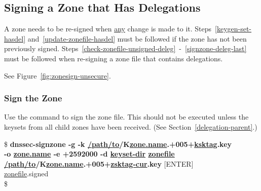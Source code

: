 
\clearpage
\subsection{Signing a Zone that Has Delegations}
\label{signzone-hasdel}

A zone needs to be re-signed when \underline{any} change is made to it.
Steps~\ref{keygen-set-hasdel} and~\ref{update-zonefile-hasdel} must be
followed if the zone has not been previously signed.
Steps~\ref{check-zonefile-unsigned-deleg}~-~\ref{signzone-deleg-last} must
be followed when re-signing a zone file that contains delegations.

See Figure~\ref{fig:zonesign-unsecure}.


		\label{keygen-set-hasdel}
		\label{update-zonefile-hasdel}

	\label{check-zonefile-unsigned-deleg}




\subsubsection{Sign the Zone}
\label{signzone-has-deleg}

Use the  command to sign the zone file.
This should not be executed unless the keysets from all child zones have been
received.  (See Section~\ref{delegation-parent}.)

\begin{tabbing}
\hspace{0.5in}\$ {\bf dnssec-signzone -g -k \underline{/path/to}/K\underline{zone.name}.+005+\underline{ksktag}.key} \\
\hspace{0.5in} {\bf -o \underline{zone.name} -e +2592000 -d \underline{keyset-dir} \underline{zonefile}} \\
\hspace{0.5in} {\bf \underline{/path/to}/K\underline{zone.name}.+005+\underline{zsktag-cur}.key} $[$ENTER$]$ \\
\hspace{0.5in} \underline{zonefile}.signed \\
\hspace{0.5in}\$ \\
\end{tabbing}

